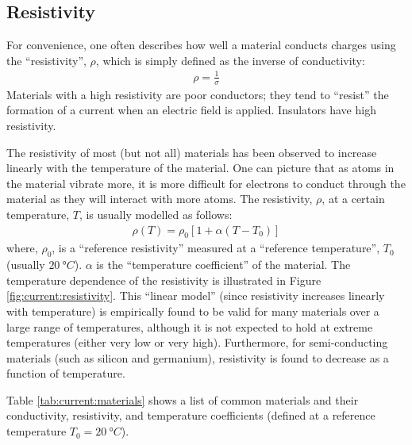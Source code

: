  
 
\subsection{Resistivity}
For convenience, one often describes how well a material conducts charges using the ``resistivity'', $\rho$, which is simply defined as the inverse of conductivity:
\begin{align*}
\rho = \frac{1}{\sigma}
\end{align*}
Materials with a high resistivity are poor conductors; they tend to ``resist'' the formation of a current when an electric field is applied. Insulators have high resistivity.

The resistivity of most (but not all) materials has been observed to increase linearly with the temperature of the material. One can picture that as atoms in the material vibrate more, it is more difficult for electrons to conduct through the material as they will interact with more atoms. The resistivity, $\rho$, at a certain temperature, $T$, is usually modelled as follows:
\begin{align*}
\rho(T)=\rho_0\left[ 1 + \alpha (T-T_0)\right]
\end{align*}
where, $\rho_0$, is a ``reference resistivity'' measured at a ``reference temperature'', $T_0$ (usually $\SI{20}{\degree C}$). $\alpha$ is the ``temperature coefficient'' of the material. The temperature dependence of the resistivity is illustrated in Figure \ref{fig:current:resistivity}.
This ``linear model'' (since resistivity increases linearly with temperature) is empirically found to be valid for many materials over a large range of temperatures, although it is not expected to hold at extreme temperatures (either very low or very high). Furthermore, for semi-conducting materials (such as silicon and germanium), resistivity is found to decrease as a function of temperature.

Table \ref{tab:current:materials} shows a list of common materials and their conductivity, resistivity, and temperature coefficients (defined at a reference temperature $T_0=\SI{20}{\degree C}$).

